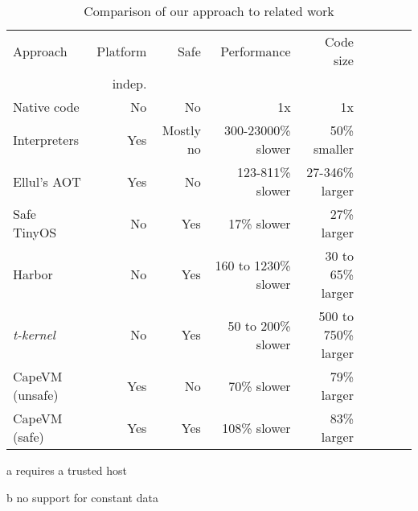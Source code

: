 \begin{table}
\caption{Comparison of our approach to related work}
\label{tbl-contribution-comparison}
    \begin{threeparttable}
    \begin{tabular}{lrrrrrrrr} %
    \toprule
    Approach          & Platform    & Safe               & Performance           & Code size                  \\
                      & indep.      &                    &                       &                            \\
    \midrule
    \midrule
    Native code       & No          & No                 & 1x                    & 1x                         \\
    Interpreters      & Yes         & Mostly no          & 300-23000\% slower    & ~50\% smaller \tnote{b}    \\ 
    Ellul's AOT       & Yes         & No                 & 123-811\% slower      & 27-346\% larger \tnote{b}  \\
    Safe TinyOS       & No          & Yes \tnote{a}      & 17\% slower           & 27\% larger                \\
    Harbor            & No          & Yes                & 160 to 1230\% slower  & 30 to 65\% larger          \\
    \emph{t-kernel}   & No          & Yes                & 50 to 200\% slower    & 500 to 750\% larger        \\
    CapeVM (unsafe)   & Yes         & No                 & 70\% slower           & 79\% larger                \\ %
    CapeVM (safe)     & Yes         & Yes                & 108\% slower          & 83\% larger                \\ %
    \bottomrule
    \end{tabular}
    \begin{tablenotes}
        \item[a] requires a trusted host
        \item[b] no support for constant data
    \end{tablenotes}
    \end{threeparttable}
\end{table}
